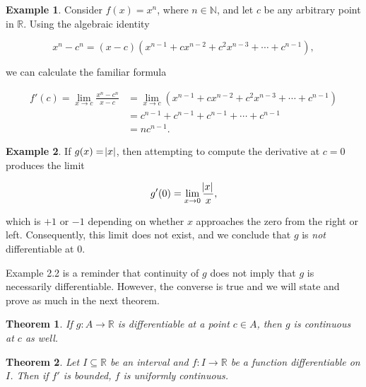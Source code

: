 \documentclass{article}
\newtheorem{theorem}{Theorem}[section]
\theoremstyle{definition}
\theoremstyle{remark}
\theoremstyle{definition}
\newtheorem{example}{Example}[section]
\begin{document}
\begin{example}
    Consider $f(x)=x^n$, where $n\in\mathbb{N}$, and let $c$ be any arbitrary point in $\mathbb{R}$. Using the algebraic identity
    
    \begin{equation*}
        x^n-c^n=(x-c)(x^{n-1}+cx^{n-2}+c^2x^{n-3}+\cdots+c^{n-1}),
    \end{equation*}
    
    \noindent we can calculate the familiar formula
    
    \begin{equation*}
        \begin{split}
            f'(c)=\lim_{x\rightarrow c}\frac{x^n-c^n}{x-c} &= \lim_{x\rightarrow c}(x^{n-1}+cx^{n-2}+c^2x^{n-3}+\cdots+c^{n-1}) \\
            &= c^{n-1}+c^{n-1} +c^{n-1}+\cdots+ c^{n-1} \\
            &= nc^{n-1}.
        \end{split}
    \end{equation*}
\end{example}

\begin{example}
    If $g(x)=\abs{x}$, then attempting to compute the derivative at $c=0$ produces the limit
    
    \begin{equation*}
        g'(0)=\lim_{x\rightarrow 0}\frac{\abs{x}}{x},
    \end{equation*}
    
    \noindent which is $+1$ or $-1$ depending on whether $x$ approaches the zero from the right or left. Consequently, this limit does not exist, and we conclude that $g$ is \textit{not} differentiable at $0$.
\end{example}

Example 2.2 is a reminder that continuity of $g$ does not imply that $g$ is necessarily differentiable. However, the converse is true and we will state and prove as much in the next theorem.

\begin{theorem}
    If $g\colon A\rightarrow\mathbb{R}$ is differentiable at a point $c\in A$, then $g$ is continuous at $c$ as well.
\end{theorem}

\newpage

\begin{theorem}
    Let $I\subseteq\mathbb{R}$ be an interval and $f\colon I\rightarrow\mathbb{R}$ be a function differentiable on $I$. Then if $f'$ is bounded, $f$ is uniformly continuous.
\end{theorem}
\end{document}
